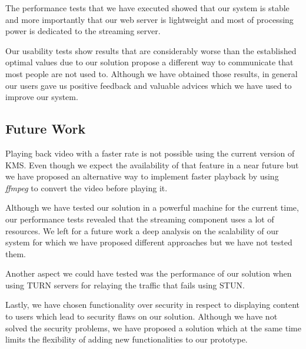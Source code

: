 \documentclass[conference,compsoc,a4paper]{IEEEtran}
\begin{document}
	The performance tests that we have executed showed that our system is stable and more importantly that our web server is lightweight and most of processing power is dedicated to the streaming server.

	Our usability tests show results that are considerably worse than the established optimal values due to our solution propose a different way to communicate that most people are not used to. Although we have obtained those results, in general our users gave us positive feedback and valuable advices which we have used to improve our system. 

\subsection{Future Work}
\label{section:future}
	Playing back video with a faster rate is not possible using the current version of \gls{KMS}. Even though we expect the availability of that feature in a near future but we have proposed an alternative way to implement faster playback by using \emph{ffmpeg} to convert the video before playing it.

	Although we have tested our solution in a powerful machine for the current time, our performance tests revealed that the streaming component uses a lot of resources. We left for a future work a deep analysis on the scalability of our system for which we have proposed different approaches but we have not tested them.

	Another aspect we could have tested was the performance of our solution when using \gls{TURN} servers for relaying the traffic that fails using \gls{STUN}.

	Lastly, we have chosen functionality over security in respect to displaying content to users which lead to security flaws on our solution. Although we have not solved the security problems, we have proposed a solution which at the same time limits the flexibility of adding new functionalities to our prototype.




%
%

%
\printbibliography
\end{document}
